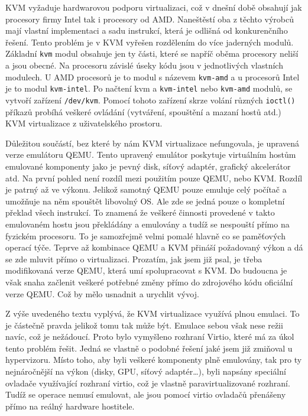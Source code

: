 KVM vyžaduje hardwarovou podporu virtualizaci, což v dnešní době obsahují jak procesory firmy Intel tak i procesory od AMD. Naneštěstí oba z těchto výrobců mají vlastní implementaci a sadu instrukcí, která je odlišná od konkurenčního řešení. Tento problém je v KVM vyřešen rozdělením do více jaderných modulů. Základní \texttt{kvm} modul obsahuje jen ty části, které se napříč oběma procesory neliší a jsou obecné. Na procesoru závislé úseky kódu jsou v jednotlivých vlastních modulech. U AMD procesorů je to modul s názevem \texttt{kvm-amd} a u procesorů Intel je to modul \texttt{kvm-intel}. Po načtení kvm a \texttt{kvm-intel} nebo \texttt{kvm-amd} modulů, se vytvoří zařízení \texttt{/dev/kvm}.
Pomocí tohoto zařízení skrze volání různých \texttt{ioctl()} příkazů  probíhá veškeré ovládání (vytváření, spouštění a mazaní hostů atd.) KVM virtualizace z uživatelského prostoru.

Důležitou součástí, bez které by nám KVM virtualizace nefungovala, je upravená verze emulátoru QEMU. Tento upravený emulátor poskytuje virtuálním hostům emulované komponenty jako je pevný disk, síťový adaptér, grafický akcelerátor atd. Na první pohled není rozdíl mezi použitím pouze QEMU, nebo KVM. Rozdíl je patrný až ve výkonu. Jelikož samotný QEMU pouze emuluje celý počítač a umožňuje na něm spouštět libovolný OS. Ale zde se jedná pouze o kompletní překlad všech instrukcí. To znamená že veškeré činnosti provedené v takto emulovaném hostu jsou překládány a emulovány a tudíž se nespouští přímo na fyzickém procesoru. To je samozřejmě velmi pomalé hlavně co se paměťových operací týče. Teprve až kombinace QEMU a KVM přináší požadovaný výkon a dá se zde mluvit přímo o virtualizaci. Prozatím, jak jsem již psal, je třeba modifikovaná verze QEMU, která umí spolupracovat s KVM. Do budoucna je však snaha začlenit veškeré potřebné změny přímo do zdrojového kódu oficiální verze QEMU. Což by mělo usnadnit a urychlit vývoj.

Z výše uvedeného textu vyplývá, že KVM virtualizace využívá plnou emulaci. To je částečně pravda jelikož tomu tak může být. Emulace sebou však nese režii navíc, což je nežádoucí. Proto bylo vymyšleno rozhraní Virtio, které má za úkol tento problém řešit. Jedná se vlastně o podobné řešení jaké jsem již zmiňoval u \xen hypervizoru. Místo toho, aby byli veškeré komponenty plně emulovány, tak pro ty nejnáročnější na výkon (disky, GPU, síťový adaptér\dots), byli napsány speciální ovladače využívající rozhraní virtio, což je vlastně paravirtualizované rozhraní. Tudíž se operace nemusí emulovat, ale jsou pomocí virtio ovladačů přenášeny přímo na reálný hardware hostitele.


